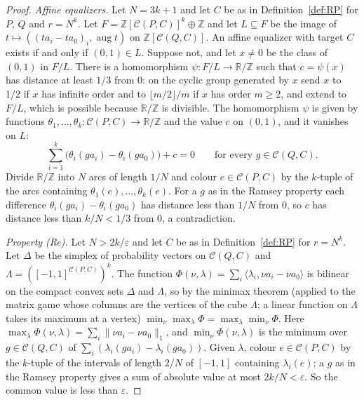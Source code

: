 \documentclass[11pt,a4paper]{article}
\theoremstyle{definition}
\newcommand{\C}{\mathcal{C}}
\newcommand{\Z}{\mathbb{Z}}
\newcommand{\R}{\mathbb{R}}
\newcommand{\aug}{\operatorname{aug}}
\begin{document}
\begin{proof}
\emph{Affine equalizers.} Let $N=3k+1$ and let $C$ be as in
Definition~\ref{def:RP} for $P$, $Q$ and $r=N^k$. Let
$F=\Z[\C(P,C)]^k\oplus\Z$ and let $L\subseteq F$ be the image of
$t\mapsto((ta_i-ta_0)_i,\aug t)$ on $\Z[\C(Q,C)]$. An affine equalizer with
target $C$ exists if and only if $(0,1)\in L$. Suppose not, and let $x\ne0$
be the class of $(0,1)$ in $F/L$. There is a homomorphism
$\psi\colon F/L\to\R/\Z$ such that $c=\psi(x)$ has distance at least $1/3$
from $0$: on the cyclic group generated by $x$ send $x$ to $1/2$ if $x$ has
infinite order and to $\lfloor m/2\rfloor/m$ if $x$ has order $m\ge2$, and
extend to $F/L$, which is possible because $\R/\Z$ is divisible. The
homomorphism $\psi$ is given by functions
$\theta_1,\dots,\theta_k\colon\C(P,C)\to\R/\Z$ and the value $c$ on $(0,1)$,
and it vanishes on $L$:
\[
 \sum_{i=1}^k\bigl(\theta_i(ga_i)-\theta_i(ga_0)\bigr)+c=0
 \qquad\text{for every }g\in\C(Q,C).
\]
Divide $\R/\Z$ into $N$ arcs of length $1/N$ and colour $e\in\C(P,C)$ by the
$k$-tuple of the arcs containing $\theta_1(e),\dots,\theta_k(e)$. For a $g$
as in the Ramsey property each difference $\theta_i(ga_i)-\theta_i(ga_0)$
has distance less than $1/N$ from $0$, so $c$ has distance less than
$k/N<1/3$ from $0$, a contradiction.

\emph{Property \textup{(Re)}.} Let $N>2k/\varepsilon$ and let $C$ be as in
Definition~\ref{def:RP} for $r=N^k$. Let $\Delta$ be the simplex of
probability vectors on $\C(Q,C)$ and
$\Lambda=([-1,1]^{\C(P,C)})^k$. The function
$\Phi(\nu,\lambda)=\sum_i\langle\lambda_i,\nu a_i-\nu a_0\rangle$ is bilinear
on the compact convex sets $\Delta$ and $\Lambda$, so by the minimax theorem \cite{vN} (applied to the matrix game whose columns are the vertices of the cube $\Lambda$; a linear function on $\Lambda$ takes its maximum at a vertex) $\min_\nu\max_\lambda\Phi=\max_\lambda\min_\nu\Phi$. Here
$\max_\lambda\Phi(\nu,\lambda)=\sum_i\|\nu a_i-\nu a_0\|_1$, and
$\min_\nu\Phi(\nu,\lambda)$ is the minimum over $g\in\C(Q,C)$ of
$\sum_i(\lambda_i(ga_i)-\lambda_i(ga_0))$. Given $\lambda$, colour
$e\in\C(P,C)$ by the $k$-tuple of the intervals of length $2/N$ of $[-1,1]$
containing $\lambda_i(e)$; a $g$ as in the Ramsey property gives a sum of
absolute value at most $2k/N<\varepsilon$. So the common value is less than
$\varepsilon$.
\end{proof}
\end{document}
